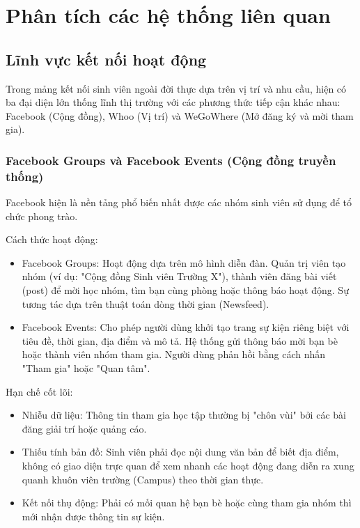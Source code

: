 \chapter{Phân tích các hệ thống liên quan}

\section{Lĩnh vực kết nối hoạt động}

Trong mảng kết nối sinh viên ngoài đời thực dựa trên vị trí và nhu cầu, hiện có ba đại diện lớn thống lĩnh thị trường với các phương thức tiếp cận khác nhau: Facebook (Cộng đồng), Whoo (Vị trí) và WeGoWhere (Mở đăng ký và mời tham gia).

\subsection{Facebook Groups và Facebook Events (Cộng đồng truyền thống)}

Facebook hiện là nền tảng phổ biến nhất được các nhóm sinh viên sử dụng để tổ chức phong trào\cite{lampe2006face}.

Cách thức hoạt động: 

\begin{itemize}
    \item Facebook Groups: Hoạt động dựa trên mô hình diễn đàn. Quản trị viên tạo nhóm (ví dụ: "Cộng đồng Sinh viên Trường X"), thành viên đăng bài viết (post) để mời học nhóm, tìm bạn cùng phòng hoặc thông báo hoạt động. Sự tương tác dựa trên thuật toán dòng thời gian (Newsfeed).
    
    \item Facebook Events: Cho phép người dùng khởi tạo trang sự kiện riêng biệt với tiêu đề, thời gian, địa điểm và mô tả. Hệ thống gửi thông báo mời bạn bè hoặc thành viên nhóm tham gia. Người dùng phản hồi bằng cách nhấn "Tham gia" hoặc "Quan tâm".
\end{itemize}

Hạn chế cốt lõi: 

\begin{itemize}
    \item Nhiễu dữ liệu: Thông tin tham gia học tập thường bị "chôn vùi" bởi các bài đăng giải trí hoặc quảng cáo.

    \item Thiếu tính bản đồ: Sinh viên phải đọc nội dung văn bản để biết địa điểm, không có giao diện trực quan để xem nhanh các hoạt động đang diễn ra xung quanh khuôn viên trường (Campus) theo thời gian thực.
    
    \item Kết nối thụ động: Phải có mối quan hệ bạn bè hoặc cùng tham gia nhóm thì mới nhận được thông tin sự kiện.
\end{itemize}

